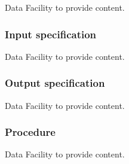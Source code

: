 \begin{note}
Data Facility to provide content.
\end{note}

\subsubsection{Input specification}

\begin{note}
Data Facility to provide content.
\end{note}

\subsubsection{Output specification}

\begin{note}
Data Facility to provide content.
\end{note}

\subsubsection{Procedure}

\begin{note}
Data Facility to provide content.
\end{note}
